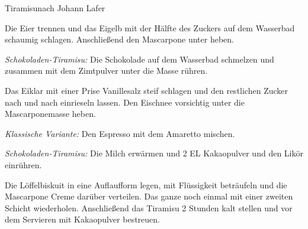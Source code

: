 \begin{recipe}{Tiramisu}{nach Johann Lafer}
  \label{Tiramisu}
  \inglist[Grundzutaten:]



  \steps

  Die Eier trennen und das Eigelb mit der Hälfte des Zuckers auf dem Wasserbad schaumig
  schlagen.  Anschließend den Mascarpone unter heben.

  \emph{Schokoladen-Tiramisu:} Die Schokolade auf dem Wasserbad schmelzen und zusammen mit
  dem Zimtpulver unter die Masse rühren.

  Das Eiklar mit einer Prise Vanillesalz steif schlagen und den restlichen Zucker nach und
  nach einrieseln lassen.  Den Eischnee vorsichtig unter die Mascarponemasse heben.

  \emph{Klassische Variante:} Den Espresso mit dem Amaretto mischen.

  \emph{Schokoladen-Tiramisu:} Die Milch erwärmen und 2 EL Kakaopulver und den Likör
  einrühren.

  Die Löffelbiskuit in eine Auflaufform legen, mit Flüssigkeit beträufeln und die
  Mascarpone Creme darüber verteilen.  Das ganze noch einmal mit einer zweiten Schicht
  wiederholen. Anschließend das Tiramisu 2 Stunden kalt stellen und vor dem Servieren mit
  Kakaopulver bestreuen.
\end{recipe}
